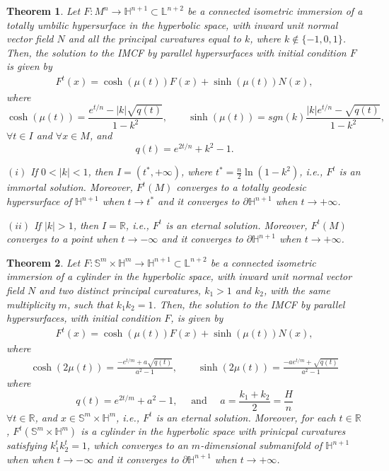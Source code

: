 \documentclass[11pt,a4paper,reqno]{amsproc}
\numberwithin{equation}{section}
\newtheorem{theorem}{\bf Theorem}[section]
\newcommand{\R}{\mathbb{R}}
\begin{document}
\begin{theorem}\label{res.22}
Let $F: M^{n} \longrightarrow \mathbb{H}^{n+1} \subset \mathbb{L}^{n+2}$ be a  connected isometric immersion of a totally umbilic hypersurface in the hyperbolic space, with  inward 
unit normal vector field $N$ and  all the principal curvatures equal to $k$, where $k \notin \{-1,0,1\}$. Then, the solution to the IMCF by parallel hypersurfaces with initial condition $F$ is given by 
\begin{eqnarray}
{F}^{t}(x)=\cosh(\mu(t))F(x)+\sinh(\mu(t))N(x), \nonumber
\end{eqnarray}
 where
\[
\cosh(\mu(t))=\frac{e^{t/n}-|k|\sqrt{q(t)}}{1-k^{2}}, \qquad  \sinh(\mu(t))=sgn(k)\frac{|k|e^{t/n}-\sqrt{q(t)}}{1-k^{2}}, 
\]
$\forall t \in I$ and $\forall x \in M$, and 
$$q(t)=e^{2t/n}+k^{2}-1.$$
\item $(i)$ If $0<|k|<1$, then $I=(t^{*},+\infty)$, where $t^{*}=\frac{n}{2}\ln(1-k^{2})$, i.e.,  ${F}^{t}$ is an immortal solution. Moreover, ${F}^{t}(M)$ converges to a totally geodesic hypersurface of $\mathbb{H}^{n+1}$ when $t \rightarrow t^*$ and it converges to $\partial\mathbb{H}^{n+1}$ when 
$t \rightarrow +\infty$.

\item $(ii)$ If $|k|>1$, then $I=\R$, i.e., ${F}^{t}$ is an eternal solution. Moreover, ${F}^{t}(M)$ converges to a point when $t \rightarrow -\infty$ and it converges to $\partial\mathbb{H}^{n+1}$ when $t \rightarrow +\infty$.
\end{theorem}

\begin{theorem}\label{res.17}
	Let $F:\mathbb{S}^m \times \mathbb{H}^m \longrightarrow \mathbb{H}^{n+1} \subset \mathbb{L}^{n+2}$ be a connected  isometric immersion of a cylinder in the hyperbolic space, with 
	inward  
	unit normal vector field $N$ and two distinct principal curvatures, $k_{1}>1$ and $k_{2}$, with the same multiplicity $m$, such that $k_{1}k_{2}=1$. Then, the solution to the IMCF by parallel hypersurfaces, with initial condition $F$, is given by
	\begin{eqnarray}
	{F}^{t}(x)=\cosh(\mu(t))F(x)+\sinh(\mu(t))N(x), \nonumber
	\end{eqnarray}
	where
	\begin{eqnarray}\label{eq.p.104}
	\cosh (2\mu(t))=\frac{-e^{t/m}+a\sqrt{q(t)}} {a^2-1}, 
	\qquad 
	\sinh (2\mu(t))=\frac{-a e^{t/m}+\sqrt{q(t)}} {a^2-1}
	\end{eqnarray}
where
 $$q(t)= e^{2t/m}+ a^2-1, \quad \mbox{ and }\quad a=\frac{k_1+k_2}{2}= \frac{H}{n}$$ 
 $\forall t \in \R$, and $x\in \mathbb{S}^m \times \mathbb{H}^m$, i.e., ${F}^{t}$ is an eternal solution.
 Moreover, for each $t\in\R$,  ${F}^{t}(\mathbb{S}^{m}\times \mathbb{H}^{m})$ is a cylinder in the hyperbolic space with prinicpal curvatures satisfying $k_1^tk_2^t=1$, which converges to an $m$-dimensional submanifold of $\mathbb{H}^{n+1}$ when  
 when $t \rightarrow -\infty$ and it converges to  
  $\partial\mathbb{H}^{n+1}$ when $t \rightarrow +\infty$.
\end{theorem}
\end{document}
